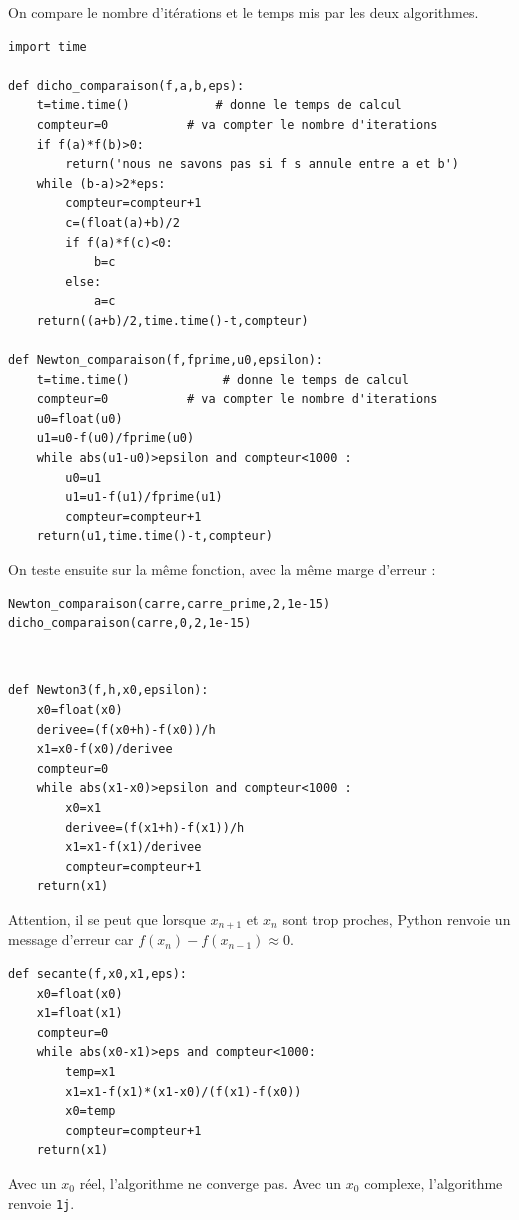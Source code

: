 \begin{solution}
On compare le nombre d'it\' erations et le temps mis par les deux algorithmes.
\begin{verbatim}
import time

def dicho_comparaison(f,a,b,eps):
    t=time.time()            # donne le temps de calcul
    compteur=0           # va compter le nombre d'iterations                
    if f(a)*f(b)>0:
        return('nous ne savons pas si f s annule entre a et b')
    while (b-a)>2*eps:
        compteur=compteur+1
        c=(float(a)+b)/2
        if f(a)*f(c)<0:
            b=c
        else:
            a=c     
    return((a+b)/2,time.time()-t,compteur)

def Newton_comparaison(f,fprime,u0,epsilon):
    t=time.time()             # donne le temps de calcul
    compteur=0           # va compter le nombre d'iterations        
    u0=float(u0)
    u1=u0-f(u0)/fprime(u0)
    while abs(u1-u0)>epsilon and compteur<1000 : 
        u0=u1
        u1=u1-f(u1)/fprime(u1)
        compteur=compteur+1
    return(u1,time.time()-t,compteur)      
\end{verbatim}
On teste ensuite sur la même fonction, avec la même marge d'erreur :
\begin{verbatim}
Newton_comparaison(carre,carre_prime,2,1e-15)
dicho_comparaison(carre,0,2,1e-15)
\end{verbatim}
\end{solution}


\begin{solution}~\\
\vspace*{-0.7cm}
\begin{verbatim}
def Newton3(f,h,x0,epsilon):
    x0=float(x0)
    derivee=(f(x0+h)-f(x0))/h
    x1=x0-f(x0)/derivee
    compteur=0
    while abs(x1-x0)>epsilon and compteur<1000 :
        x0=x1
        derivee=(f(x1+h)-f(x1))/h
        x1=x1-f(x1)/derivee
        compteur=compteur+1
    return(x1) 
\end{verbatim}
\end{solution}

\begin{solution}
Attention, il se peut que lorsque $x_{n+1}$ et $x_n$ sont trop proches, Python renvoie un message d'erreur car $f(x_{n})-f(x_{n-1})\approx 0$.
\begin{verbatim}
def secante(f,x0,x1,eps):
    x0=float(x0)
    x1=float(x1)
    compteur=0
    while abs(x0-x1)>eps and compteur<1000:
        temp=x1
        x1=x1-f(x1)*(x1-x0)/(f(x1)-f(x0))
        x0=temp
        compteur=compteur+1
    return(x1) 
\end{verbatim}
\end{solution}

\begin{solution}
Avec un $x_0$ r\' eel, l'algorithme ne converge pas. Avec un $x_0$ complexe, l'algorithme renvoie \verb?1j?.
\end{solution}

